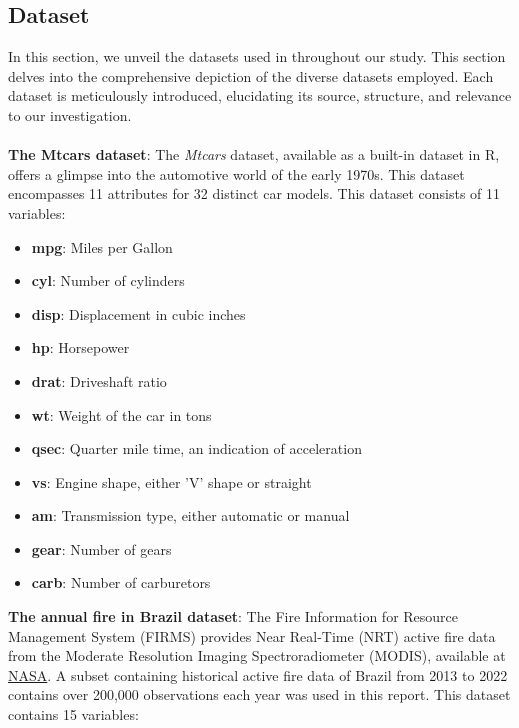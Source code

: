 \documentclass{article}\usepackage[]{graphicx}\usepackage[]{xcolor}
\begin{document}
\subsection{Dataset}
In this section, we unveil the datasets used in throughout our study. This section delves into the comprehensive depiction of the diverse datasets employed. Each dataset is meticulously introduced, elucidating its source, structure, and relevance to our investigation.\\\\
\textbf{The Mtcars dataset}: The \textit{Mtcars} dataset, available as a built-in dataset in R, offers a glimpse into the automotive world of the early 1970s. This dataset encompasses 11 attributes for 32 distinct car models. This dataset consists of 11 variables:
\begin{itemize}
    \item \textbf{mpg}: Miles per Gallon
    \item \textbf{cyl}: Number of cylinders
    \item \textbf{disp}: Displacement in cubic inches
    \item \textbf{hp}: Horsepower
    \item \textbf{drat}: Driveshaft ratio
    \item \textbf{wt}: Weight of the car in tons
    \item \textbf{qsec}: Quarter mile time, an indication of acceleration
    \item \textbf{vs}: Engine shape, either 'V' shape or straight
    \item \textbf{am}: Transmission type, either automatic or manual
    \item \textbf{gear}: Number of gears
    \item \textbf{carb}: Number of carburetors
\end{itemize}
\noindent
\textbf{The annual fire in Brazil dataset}: The Fire Information for Resource Management System (FIRMS) provides Near Real-Time (NRT) active fire data from the Moderate Resolution Imaging Spectroradiometer (MODIS), available at \href{https://firms.modaps.eosdis.nasa.gov}{NASA}. A subset containing historical active fire data of Brazil from 2013 to 2022 contains over 200,000 observations each year was used in this report. This dataset contains 15 variables:
\end{document}
